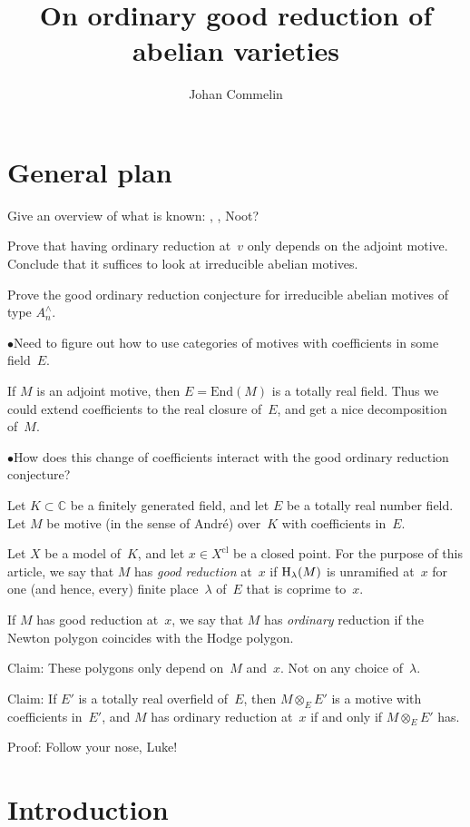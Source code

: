 \documentclass{amsart}
\title{On ordinary good reduction of abelian varieties}
\author{Johan Commelin}
\def\HH{\textnormal{H}}
\begin{document}
\maketitle

\section{General plan}

Give an overview of what is known:
\cite{MR1603865},
\cite{MR3494322},
Noot?

Prove that having ordinary reduction at~$v$ only depends on the adjoint motive.
Conclude that it suffices to look at irreducible abelian motives.

Prove the good ordinary reduction conjecture
for irreducible abelian motives of type $A_n^\wedge$.

$\bullet$\quad Need to figure out how to use categories of motives
with coefficients in some field~$E$.

If $M$ is an adjoint motive,
then $E = \mathrm{End}(M)$ is a totally real field.
Thus we could extend coefficients to the real closure of~$E$,
and get a nice decomposition of~$M$.

$\bullet$\quad How does this change of coefficients interact
with the good ordinary reduction conjecture?

Let $K \subset \mathbb{C}$ be a finitely generated field,
and let $E$ be a totally real number field.
Let $M$ be motive (in the sense of Andr\'e)
over~$K$ with coefficients in~$E$.

Let $X$ be a model of~$K$,
and let $x \in X^\mathrm{cl}$ be a closed point.
For the purpose of this article,
we say that $M$ has \emph{good reduction} at~$x$
if $\HH_\lambda(M)$ is unramified at~$x$
for one (and hence, every) finite place~$\lambda$ of~$E$ that is coprime to~$x$.

If $M$ has good reduction at~$x$,
we say that $M$ has \emph{ordinary} reduction
if the Newton polygon coincides with the Hodge polygon.

Claim: These polygons only depend on~$M$ and~$x$.
Not on any choice of~$\lambda$.

Claim: If $E'$ is a totally real overfield of~$E$,
then $M \otimes_E E'$ is a motive with coefficients in~$E'$,
and $M$ has ordinary reduction at~$x$
if and only if $M \otimes_E E'$ has.

Proof: Follow your nose, Luke!

\section{Introduction}
\end{document}
